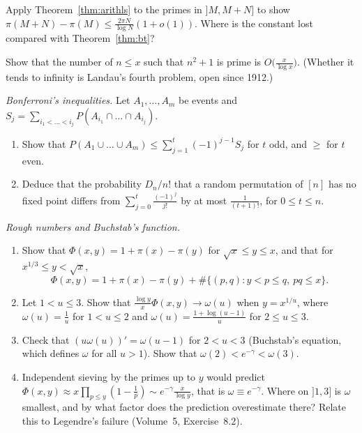 \begin{exercise}[$\star$]\label{ex:lsprimes}
Apply Theorem~\ref{thm:arithls} to the primes in $]M,M+N]$ to show $\pi(M+N)-\pi(M)\le\frac{2\pi N}{\log N}(1+o(1))$. Where is the constant lost compared with Theorem~\ref{thm:bt}?
\end{exercise}

\begin{exercise}[$\star\star\star$]\label{ex:nsq1}
Show that the number of $n\le x$ such that $n^2+1$ is prime is $O\bigl(\frac x{\log x}\bigr)$. (Whether it tends to infinity is Landau's fourth problem, open since 1912.)
\end{exercise}

\begin{exercise}[$\star$]\label{pb:bonferroni}
\emph{Bonferroni's inequalities.} Let $A_1,\dots,A_m$ be events and $S_j=\sum_{i_1<\dots<i_j}P(A_{i_1}\cap\dots\cap A_{i_j})$.
\begin{enumerate}[label=(\alph*)]
\item Show that $P(A_1\cup\dots\cup A_m)\le\sum_{j=1}^t(-1)^{j-1}S_j$ for $t$ odd, and $\ge$ for $t$ even.
\item Deduce that the probability $D_n/n!$ that a random permutation of $[n]$ has no fixed point differs from $\sum_{j=0}^t\frac{(-1)^j}{j!}$ by at
most $\frac1{(t+1)!}$, for $0\le t\le n$.
\end{enumerate}
\end{exercise}

\begin{exercise}[$\star\star\star$]\label{pb:buchstab}
\emph{Rough numbers and Buchstab's function.}
\begin{enumerate}[label=(\alph*)]
\item Show that $\Phi(x,y)=1+\pi(x)-\pi(y)$ for $\sqrt x\le y\le x$, and that for $x^{1/3}\le y<\sqrt x$,
\[
\Phi(x,y)=1+\pi(x)-\pi(y)+\#\{(p,q):y<p\le q,\ pq\le x\}.
\]
\item Let $1<u\le3$. Show that $\frac{\log y}x\Phi(x,y)\to\omega(u)$ when $y=x^{1/u}$, where $\omega(u)=\frac1u$ for $1<u\le2$ and $\omega(u)=\frac{1+\log(u-1)}u$ for $2\le u\le3$.
\item Check that $(u\omega(u))'=\omega(u-1)$ for $2<u<3$ (Buchstab's equation, which defines $\omega$ for all $u>1$). Show that $\omega(2)<e^{-\gamma}<\omega(3)$.
\item Independent sieving by the primes up to $y$ would predict $\Phi(x,y)\approx x\prod_{p\le y}(1-\frac1p)\sim e^{-\gamma}\frac x{\log y}$, that is $\omega\equiv e^{-\gamma}$. Where on $]1,3]$ is $\omega$ smallest, and by what factor
does the prediction overestimate there? Relate this to Legendre's failure (Volume~5, Exercise~8.2).
\end{enumerate}
\end{exercise}


